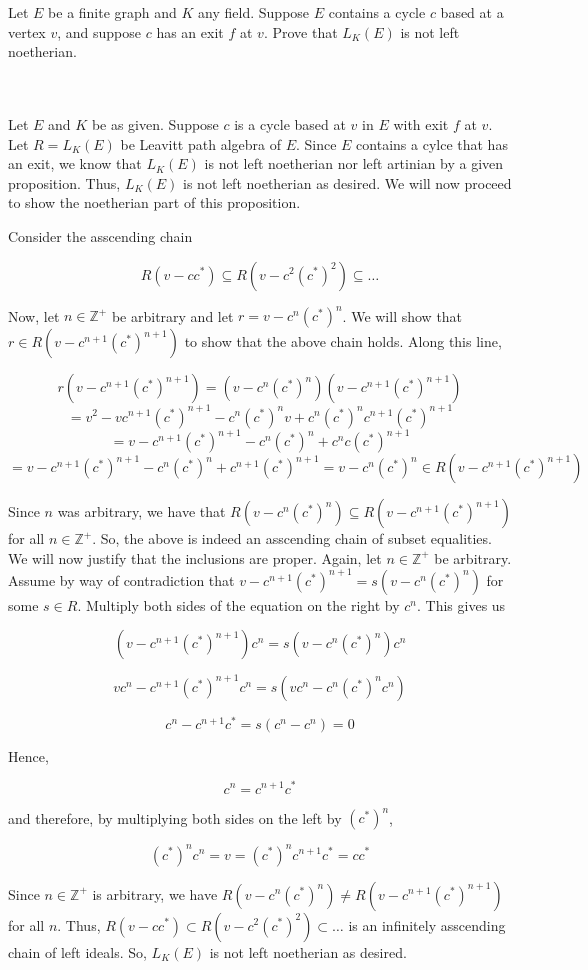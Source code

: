Let $E$ be a finite graph and $K$ any field. Suppose $E$ contains a cycle $c$ based at a vertex $v$, and
suppose $c$ has an exit $f$ at $v$. Prove that $L_K(E)$ is not left noetherian.\\\\

\begin{solution}\renewcommand{\qedsymbol}{}\ \\
    Let $E$ and $K$ be as given. Suppose $c$ is a cycle based at $v$ in $E$ with exit $f$ at $v$. Let
    $R=L_K(E)$ be Leavitt path algebra of $E$. Since $E$ contains a cylce that has an exit, we know that
    $L_K(E)$ is not left noetherian nor left artinian by a given proposition. Thus, $L_K(E)$ is not left
    noetherian as desired. We will now proceed to show the noetherian part of this proposition.

    Consider the asscending chain

    $$R(v-cc^*)\subseteq R(v-c^2(c^*)^2)\subseteq\ldots$$

    Now, let $n\in\mathbb{Z}^+$ be arbitrary and let $r=v-c^n(c^*)^n$. We will show that
    $r\in R(v-c^{n+1}(c^*)^{n+1})$ to show that the above chain holds. Along this line,

    $$r(v-c^{n+1}(c^*)^{n+1})=(v-c^n(c^*)^n)(v-c^{n+1}(c^*)^{n+1})$$
    $$=v^2-vc^{n+1}(c^*)^{n+1}-c^n(c^*)^nv+c^n(c^*)^nc^{n+1}(c^*)^{n+1}$$
    $$=v-c^{n+1}(c^*)^{n+1}-c^n(c^*)^n+c^nc(c^*)^{n+1}$$
    $$=v-c^{n+1}(c^*)^{n+1}-c^n(c^*)^n+c^{n+1}(c^*)^{n+1}=v-c^n(c^*)^n\in R(v-c^{n+1}(c^*)^{n+1})$$

    Since $n$ was arbitrary, we have that $R(v-c^{n}(c^*)^{n})\subseteq R(v-c^{n+1}(c^*)^{n+1})$ for all
    $n\in\mathbb{Z}^+$. So, the above is indeed an asscending chain of subset equalities. We will now
    justify that the inclusions are proper. Again, let $n\in\mathbb{Z}^+$ be arbitrary. Assume by way of
    contradiction that $v-c^{n+1}(c^*)^{n+1}=s(v-c^n(c^*)^n)$ for some $s\in R$. Multiply both sides of
    the equation on the right by $c^n$. This gives us

    $$(v-c^{n+1}(c^*)^{n+1})c^n=s(v-c^n(c^*)^n)c^n$$

    $$vc^n-c^{n+1}(c^*)^{n+1}c^n=s(vc^n-c^n(c^*)^nc^n)$$

    $$c^n-c^{n+1}c^*=s(c^n-c^n)=0$$

    Hence,

    $$c^n=c^{n+1}c^*$$

    and therefore, by multiplying both sides on the left by $(c^*)^n$,

    $$(c^*)^nc^n=v=(c^*)^nc^{n+1}c^*=cc^*$$

    Since $n\in\mathbb{Z}^+$ is arbitrary, we have $R(v-c^{n}(c^*)^{n})\neq R(v-c^{n+1}(c^*)^{n+1})$
    for all $n$. Thus, $R(v-cc^*)\subset R(v-c^2(c^*)^2)\subset\ldots$ is an infinitely asscending chain
    of left ideals. So, $L_K(E)$ is not left noetherian as desired.

\end{solution}

